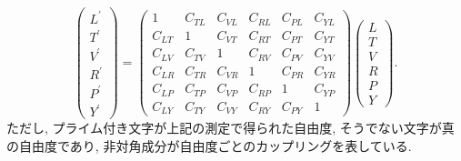 \begin{equation}
\begin{pmatrix}
L^{\prime} \\
T^{\prime} \\
V^{\prime} \\ 
R^{\prime} \\
P^{\prime}\\
Y^{\prime}
\end{pmatrix}=
\begin{pmatrix}
1&C_{TL}&C_{VL}&C_{RL}&C_{PL}&C_{YL}\\
C_{LT}&1&C_{VT}&C_{RT}&C_{PT}&C_{YT}\\
C_{LV}&C_{TV}&1&C_{RV}&C_{PV}&C_{YV}\\
C_{LR}&C_{TR}&C_{VR}&1&C_{PR}&C_{YR}\\
C_{LP}&C_{TP}&C_{VP}&C_{RP}&1&C_{YP} \\
C_{LY}&C_{TY}&C_{VY}&C_{RY}&C_{PY}&1
\end{pmatrix}
\begin{pmatrix}
L\\
T\\
V \\ 
R \\
P \\
Y
\end{pmatrix}.
\label{eq6.16}
\end{equation}
ただし, プライム付き文字が上記の測定で得られた自由度, そうでない文字が真の自由度であり, 非対角成分が自由度ごとのカップリングを表している. 
